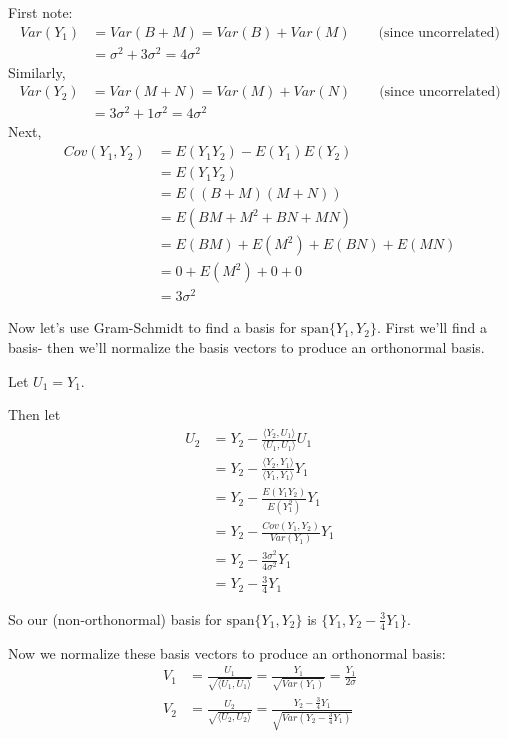 \documentclass[paper=a4, fontsize=11pt]{scrartcl} %
\numberwithin{equation}{section} %
\numberwithin{figure}{section} %
\numberwithin{table}{section} %
\begin{document}
First note:
\begin{align*}
Var(Y_1) &= Var(B+M) = Var(B) + Var(M) \qquad{} \textrm{(since uncorrelated)} \\
   &= \sigma^2 + 3\sigma^2 = 4\sigma^2
\end{align*}
Similarly,
\begin{align*}
Var(Y_2) &= Var(M + N) = Var(M) + Var(N) \qquad{} \textrm{(since uncorrelated)} \\
   &= 3\sigma^2 + 1\sigma^2 = 4\sigma^2
\end{align*}
Next,
\begin{align*}
Cov(Y_1, Y_2) &= E(Y_1Y_2) - E(Y_1)E(Y_2) \\ 
   &= E(Y_1 Y_2) \\
   &= E\left((B + M)(M + N)\right) \\
   &= E\left(B M + M^2 + B N + M N\right) \\
   &= E(B M) + E(M^2) + E(B N) + E(M N) \\
   &= 0 + E(M^2) + 0 + 0 \\
   &= 3\sigma^2
\end{align*}

Now let's use Gram-Schmidt to find a basis for $\textrm{span}\{Y_1, Y_2\}$. First we'll find a basis- then we'll normalize the basis vectors to produce an orthonormal basis.

Let $U_1 = Y_1$.

Then let
\begin{align*}
U_2 &= Y_2 - \frac{\langle Y_2, U_1 \rangle}{\langle U_1, U_1 \rangle}U_1 \\
   &=Y_2 - \frac{\langle Y_2, Y_1 \rangle}{\langle Y_1, Y_1 \rangle}Y_1 \\
   &= Y_2 - \frac{ E(Y_1Y_2)}{E(Y_1^2)}Y_1 \\
   &= Y_2 - \frac{ Cov(Y_1,Y_2)}{Var(Y_1)}Y_1 \\
   &= Y_2 - \frac{ 3\sigma^2}{4 \sigma^2}Y_1 \\
   &= Y_2 - \frac{ 3}{4}Y_1
\end{align*}

So our (non-orthonormal) basis for $\textrm{span}\{Y_1, Y_2\}$ is $\{Y_1, Y_2 - \frac{ 3}{4}Y_1\}$.

Now we normalize these basis vectors to produce an orthonormal basis:
\begin{align*}
V_1 &= \frac{U_1}{\sqrt{\langle U_1, U_1 \rangle}} =  \frac{Y_1}{\sqrt{Var(Y_1)}} = \frac{Y_1}{2\sigma} \\
V_2 &= \frac{U_2}{\sqrt{\langle U_2, U_2 \rangle}} =  \frac{Y_2 - \frac{ 3}{4}Y_1}{\sqrt{Var(Y_2 - \frac{ 3}{4}Y_1)}}
\end{align*}
\end{document}
